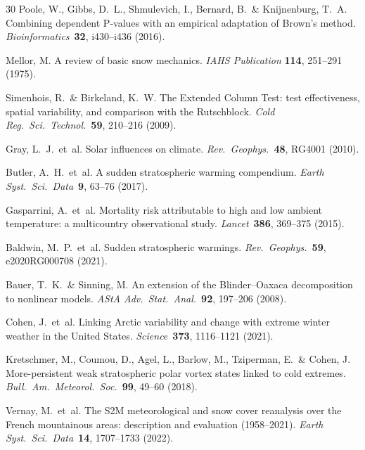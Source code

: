\documentclass[11pt,letterpaper]{article}
\begin{document}
\begin{thebibliography}{30}
Poole, W., Gibbs, D.~L., Shmulevich, I., Bernard, B.\ \& Knijnenburg, T.~A. Combining dependent P-values with an empirical adaptation of Brown's method. \textit{Bioinformatics}\ \textbf{32}, i430--i436 (2016).

Mellor, M. A review of basic snow mechanics. \textit{IAHS Publication} \textbf{114}, 251--291 (1975).

Simenhois, R.\ \& Birkeland, K.~W. The Extended Column Test: test effectiveness, spatial variability, and comparison with the Rutschblock. \textit{Cold Reg.\ Sci.\ Technol.}\ \textbf{59}, 210--216 (2009).

Gray, L.~J.\ et~al. Solar influences on climate. \textit{Rev.\ Geophys.}\ \textbf{48}, RG4001 (2010).

Butler, A.~H.\ et~al. A sudden stratospheric warming compendium. \textit{Earth Syst.\ Sci.\ Data}\ \textbf{9}, 63--76 (2017).

Gasparrini, A.\ et~al. Mortality risk attributable to high and low ambient temperature: a multicountry observational study. \textit{Lancet}\ \textbf{386}, 369--375 (2015).

Baldwin, M.~P.\ et~al. Sudden stratospheric warmings. \textit{Rev.\ Geophys.}\ \textbf{59}, e2020RG000708 (2021).

Bauer, T.~K.\ \& Sinning, M. An extension of the Blinder--Oaxaca decomposition to nonlinear models. \textit{AStA Adv.\ Stat.\ Anal.}\ \textbf{92}, 197--206 (2008).

Cohen, J.\ et~al. Linking Arctic variability and change with extreme winter weather in the United States. \textit{Science}\ \textbf{373}, 1116--1121 (2021).

Kretschmer, M., Coumou, D., Agel, L., Barlow, M., Tziperman, E.\ \& Cohen, J. More-persistent weak stratospheric polar vortex states linked to cold extremes. \textit{Bull.\ Am.\ Meteorol.\ Soc.}\ \textbf{99}, 49--60 (2018).

Vernay, M.\ et~al. The S2M meteorological and snow cover reanalysis over the French mountainous areas: description and evaluation (1958--2021). \textit{Earth Syst.\ Sci.\ Data}\ \textbf{14}, 1707--1733 (2022).

\end{thebibliography}

\clearpage
\end{document}
